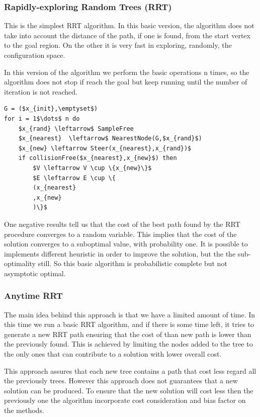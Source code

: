 \documentclass[10pt]{article}
\begin{document}
	\subsubsection{Rapidly-exploring Random Trees (RRT)}
	
	This is the simplest RRT algorithm. In this basic version, the algorithm does not take into account the distance of the path, if one is found, from the start vertex to the goal region. On the other it is very fast in exploring, randomly, the configuration space.

	In this version of the algorithm we perform the basic operations n times, so the algorithm does not stop if reach the goal but keep running until the number of iteration is not reached. 
	\begin{lstlisting}[frame=single, mathescape=true,caption={RRT}]
G = ($x_{init},\emptyset$)
for i = 1$\dots$ n do
	$x_{rand} \leftarrow$ SampleFree
	$x_{nearest}  \leftarrow$ NearestNode(G,$x_{rand}$)
	$x_{new} \leftarrow Steer(x_{nearest},x_{rand})$	
	if collisionFree($x_{nearest},x_{new}$) then
		$V \leftarrow V \cup \{x_{new}\}$
		$E \leftarrow E \cup \{
		(x_{nearest}
		,x_{new}
		)\}$
	\end{lstlisting}
	
	One negative results tell us that the cost of the best path found by the RRT procedure converges to a random variable. This implies that the cost of the solution converges to a suboptimal value, with probability one. It is possible to implements different heuristic in order to improve the solution, but the the sub-optimality still. So this basic algorithm is probabilistic complete but not asymptotic optimal.
	
	\subsubsection{Anytime RRT}
	
	The main idea behind this approach is that we have a limited amount of time. In this time we run a basic RRT algorithm, and if there is some time left, it tries to generate a new RRT path ensuring that the cost of than new path is lower than the previously found. This is achieved by limiting the nodes added to the tree to the only ones that can contribute to a solution with lower overall cost. 
	
	This approach assures that each new tree contains a path that cost less regard all the previously trees. However this approach does not guarantees that a new solution can be produced. To ensure that the new solution will cost less then the previously one the algorithm incorporate cost consideration and bias factor on the methods.
	
\end{document}
